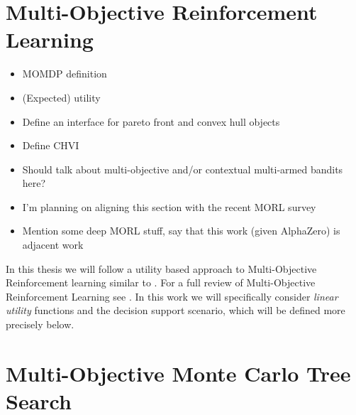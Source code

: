 \section{Multi-Objective Reinforcement Learning}
\label{sec:2-3-morl}
    
    \begin{itemize}
        \item MOMDP definition
        \item (Expected) utility
        \item Define an interface for pareto front and convex hull objects
        \item Define CHVI
        \item Should talk about multi-objective and/or contextual multi-armed bandits here?
        \item I'm planning on aligning this section with the recent MORL survey \cite{morl_survey}
        \item Mention some deep MORL stuff, say that this work (given AlphaZero) is adjacent work
    \end{itemize}


    In this thesis we will follow a utility based approach to Multi-Objective Reinforcement learning similar to . For a full review of Multi-Objective Reinforcement Learning see . In this work we will specifically consider \textit{linear utility} functions and the decision support scenario, which will be defined more precisely below.
    









\section{Multi-Objective Monte Carlo Tree Search}
\label{sec:2-4-momcts}


